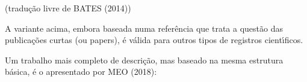 \documentclass[
12pt,		%
openright,	%
twoside,  %
a4paper,			%
chapter=TITLE,		%
english,			%
french,				%
spanish,			%
brazil				%
]{USPSC-classe/USPSC}
\begin{document}
\begin{flushright}
\setlength{\absparsep}{0pt}
\tiny \begin{flushright}
\setlength{\absparsep}{0pt}
\tiny \begin{flushright}
\setlength{\absparsep}{0pt}
\tiny \begin{flushright}
\setlength{\absparsep}{0pt}
\tiny \begin{flushright}
\setlength{\absparsep}{0pt}
\tiny \begin{flushright}
\setlength{\absparsep}{0pt}
\tiny \begin{flushright}
\setlength{\absparsep}{0pt}
\tiny \begin{flushright}
\setlength{\absparsep}{0pt}
\tiny \begin{flushright}
\setlength{\absparsep}{0pt}
\tiny \begin{flushright}
\setlength{\absparsep}{0pt}
\tiny (tradu\c{c}\~ao livre de BATES (2014)) \normalsize 
\end{flushright}

 \normalsize 
\end{flushright}

 \normalsize 
\end{flushright}

 \normalsize 
\end{flushright}

 \normalsize 
\end{flushright}

 \normalsize 
\end{flushright}

 \normalsize 
\end{flushright}

 \normalsize 
\end{flushright}

 \normalsize 
\end{flushright}

 \normalsize 
\end{flushright}


A variante acima, embora baseada numa refer\^encia que trata a quest\~ao das publica\c{c}\~oes curtas (ou \textquotedbl papers\textquotedbl ), \'e v\'alida para outros tipos de registros cient\'{\i}ficos.










Um trabalho mais completo de descri\c{c}\~ao, mas baseado na mesma estrutura b\'asica, \'e o apresentado por MEO (2018):
\end{document}
